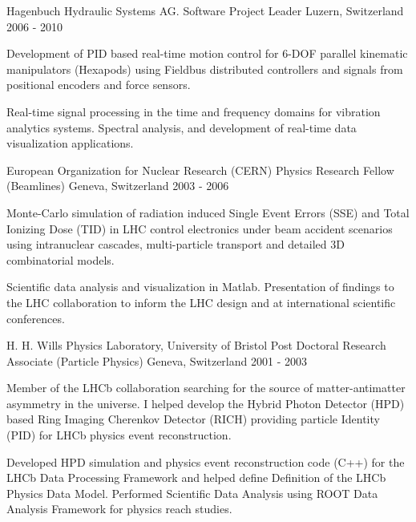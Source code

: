 \begin{cventries}
\cventry
{Hagenbuch Hydraulic Systems AG.} %
{Software Project Leader} %
{Luzern, Switzerland} %
{2006 - 2010} %
{
  \begin{cvitems} %
    \item {
      Development of PID based real-time motion control for 6-DOF parallel 
      kinematic manipulators (Hexapods) using Fieldbus distributed controllers 
      and signals from positional encoders and force sensors.}
    \item {
      Real-time signal processing in the time and frequency domains for 
      vibration analytics systems. Spectral analysis, and development of 
      real-time data visualization applications.}
  \end{cvitems}
}

\cventry
{European Organization for Nuclear Research (CERN)} %
{Physics Research Fellow (Beamlines)} %
{Geneva, Switzerland} %
{2003 - 2006} %
{
  \begin{cvitems} %
    \item {
      Monte-Carlo simulation of radiation induced Single Event Errors (SSE) and 
      Total Ionizing Dose (TID) in LHC control electronics under 
      beam accident scenarios using intranuclear cascades, multi-particle 
      transport and detailed 3D combinatorial models.}
      \item{
      Scientific data analysis and visualization in Matlab. Presentation of findings
      to the LHC collaboration to inform the LHC design and at international scientific conferences.}
  \end{cvitems}
}

\cventry
{H. H. Wills Physics Laboratory, University of Bristol} %
{Post Doctoral Research Associate (Particle Physics)} %
{Geneva, Switzerland} %
{2001 - 2003} %
{
  \begin{cvitems} %
    \item {
      Member of the LHCb collaboration searching for the source of matter-antimatter 
      asymmetry in the universe. I helped develop the Hybrid Photon Detector (HPD) based 
      Ring Imaging Cherenkov Detector (RICH) providing particle Identity (PID) 
      for LHCb physics event reconstruction.}
    \item {
      Developed HPD simulation and physics event reconstruction code (C++) for 
      the LHCb Data Processing Framework and helped define Definition of the 
      LHCb Physics Data Model. Performed Scientific Data Analysis using ROOT Data 
      Analysis Framework for physics reach studies.
        }
  \end{cvitems}
}


\end{cventries}
